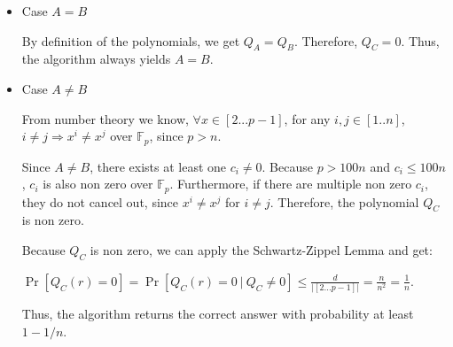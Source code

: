 \begin{itemize}
    \item Case $A = B$
    
    By definition of the polynomials, we get $Q_A = Q_B$. Therefore, $Q_C = 0$. Thus, the algorithm always yields $A = B$.
    
    \item Case $A \neq B$
    
    From number theory we know, $\forall x \in [2...p-1]$, for any $i, j \in [1..n]$, $i \neq j \Rightarrow x^i \neq x^j$ over $\mathbb{F}_p$, since $p > n$.
    
    Since $A \neq B$, there exists at least one $c_i \neq 0$. 
    Because $p > 100n$ and $c_i \leq 100n$, $c_i$ is also non zero over $\mathbb{F}_p$.
    Furthermore, if there are multiple non zero $c_i$, they do not cancel out, since $x^i \neq x^j$ for $i \neq j$. Therefore, the polynomial $Q_C$ is non zero. 
    
    Because $Q_C$ is non zero, we can apply the Schwartz-Zippel Lemma and get:
    
    $\Pr[Q_C(r) = 0] =
    \Pr[Q_C(r) = 0 ~|~ Q_C \neq 0] \leq 
    \frac{d}{|[2...p-1]|} = \frac{n}{n^2} = \frac{1}{n}$.
    
    Thus, the algorithm returns the correct answer with probability at least $1 - 1/n$.
    
\end{itemize}


\pagebreak